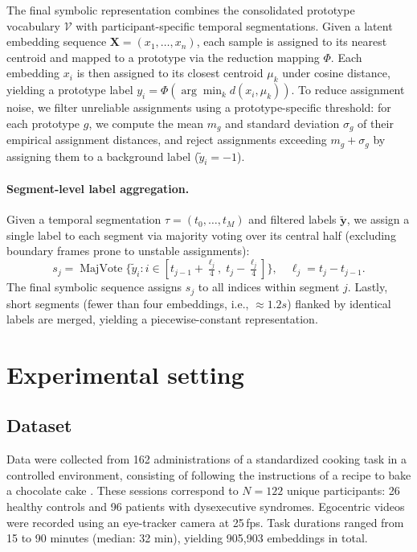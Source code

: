 \documentclass[runningheads]{llncs}
\begin{document}
        The final symbolic representation combines the consolidated prototype vocabulary $\mathcal{V}$ with participant-specific temporal segmentations. Given a latent embedding sequence $\mathbf{X} = (x_1, \ldots, x_n)$, each sample is assigned to its nearest centroid and mapped to a prototype via the reduction mapping $\Phi$. Each embedding $x_i$ is then assigned to its closest centroid $\mu_k$ under cosine distance, yielding a prototype label $y_i = \Phi(\arg\min_k d(x_i, \mu_k))$. To reduce assignment noise, we filter unreliable assignments using a prototype-specific threshold: for each prototype $g$, we compute the mean $m_g$ and standard deviation $\sigma_g$ of their empirical assignment distances, and reject assignments exceeding $m_g + \sigma_g$ by assigning them to a background label ($\tilde{y}_i = -1$).

        \paragraph{Segment-level label aggregation.} Given a temporal segmentation $\tau = (t_0, \ldots, t_M)$ and filtered labels $\tilde{\mathbf{y}}$, we assign a single label to each segment via majority voting over its central half (excluding boundary frames prone to unstable assignments):
        \[
        s_j = \operatorname{MajVote}\{\tilde{y}_i : i \in [t_{j-1}+\tfrac{\ell_j}{4},\; t_j-\tfrac{\ell_j}{4}]\},
        \quad \ell_j = t_j - t_{j-1}.
        \]
        The final symbolic sequence assigns $s_j$ to all indices within segment $j$. Lastly, short segments (fewer than four embeddings, i.e., $\approx 1.2s$) flanked by identical labels are merged, yielding a piecewise-constant representation.

\vspace{-0.2cm}
\section{Experimental setting}
    \label{sec:experimental_setting}

    \subsection{Dataset}

    Data were collected from 162 administrations of a standardized cooking task in a controlled environment, consisting of following the instructions of a recipe to bake a chocolate cake \cite{Chevignard2008}. These sessions correspond to $N=122$ unique participants: 26 healthy controls and 96 patients with dysexecutive syndromes. Egocentric videos were recorded using an eye-tracker camera at 25\,fps. Task durations ranged from 15 to 90 minutes (median: 32 min), yielding 905,903 embeddings in total.
    \vspace{-0.1cm}
\end{document}
